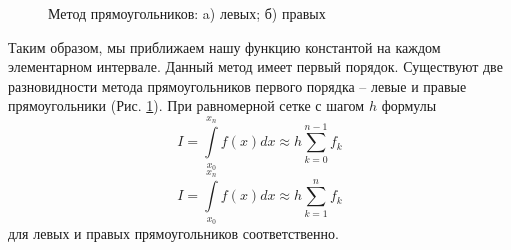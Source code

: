 		\begin{figure}[h!]
			\begin{minipage}[h]{0.49\linewidth}
			\end{minipage}
			\hfill
			\begin{minipage}[h]{0.49\linewidth}
			\end{minipage}
			\caption{Метод прямоугольников: a) левых; б) правых}
			\label{Rects}
		\end{figure}
	
		Таким образом, мы приближаем нашу функцию константой на каждом элементарном интервале. Данный метод имеет первый порядок. Существуют две разновидности метода прямоугольников первого порядка -- левые и правые прямоугольники (Рис. \ref{Rects}). При равномерной сетке с шагом $h$ формулы
		\begin{equation}
			I = \int\limits_{x_0}^{x_n} f(x) dx \approx h\sum\limits_{k = 0}^{n-1}f_k
		\end{equation}
		\begin{equation}
			I = \int\limits_{x_0}^{x_n} f(x) dx \approx h\sum_{k = 1}^n f_k
		\end{equation}
		для левых и правых прямоугольников соответственно.
		
